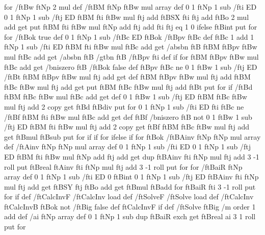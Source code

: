{{{{      } for
      /ftBw ftNp 2 mul def
      /ftBM ftNp ftBw mul array def
      0 1 ftNp 1 sub { /fti ED
        0 1 ftNp 1 sub { /ftj ED
          ftBM fti ftBw mul ftj add ftBSX fti ftj add ftBo 2 mul add get put
          ftBM fti ftBw mul ftNp add ftj add fti ftj eq { 1 }{ 0 } ifelse ftBint put
        } for
      } for
      /ftBok true def
      0 1 ftNp 1 sub { /ftBc ED
        ftBok {
          /ftBpv ftBc def
          ftBc 1 add 1 ftNp 1 sub { /fti ED
            ftBM fti ftBw mul ftBc add get /absbn ftB
            ftBM ftBpv ftBw mul ftBc add get /absbn ftB
            /gtbn ftB { /ftBpv fti def } if
          } for
          ftBM ftBpv ftBw mul ftBc add get /bniszero ftB { /ftBok false def }{
            ftBpv ftBc ne {
              0 1 ftBw 1 sub { /ftj ED
                /ftBt ftBM ftBpv ftBw mul ftj add get def
                ftBM ftBpv ftBw mul ftj add ftBM ftBc ftBw mul ftj add get put
                ftBM ftBc ftBw mul ftj add ftBt put
              } for
            } if
            /ftBd ftBM ftBc ftBw mul ftBc add get def
            0 1 ftBw 1 sub { /ftj ED
              ftBM ftBc ftBw mul ftj add 2 copy get ftBd ftBdiv put } for
            0 1 ftNp 1 sub { /fti ED
              fti ftBc ne {
                /ftBf ftBM fti ftBw mul ftBc add get def
                ftBf /bniszero ftB not {
                  0 1 ftBw 1 sub { /ftj ED
                    ftBM fti ftBw mul ftj add 2 copy get
                    ftBf ftBM ftBc ftBw mul ftj add get ftBmul ftBsub put
                  } for
                } if
              } if
            } for
          } ifelse
        } if
      } for
      ftBok {
        /ftBAinv ftNp ftNp mul array def /ftAinv ftNp ftNp mul array def
        0 1 ftNp 1 sub { /fti ED
          0 1 ftNp 1 sub { /ftj ED
            ftBM fti ftBw mul ftNp add ftj add get
            dup ftBAinv fti ftNp mul ftj add 3 -1 roll put
            ftBreal ftAinv fti ftNp mul ftj add 3 -1 roll put
          } for
        } for
        /ftBaiR ftNp array def
        0 1 ftNp 1 sub { /fti ED
          0 ftBint
          0 1 ftNp 1 sub { /ftj ED
            ftBAinv fti ftNp mul ftj add get ftBSY ftj ftBo add get ftBmul ftBadd } for
          ftBaiR fti 3 -1 roll put
        } for
      } if
    } def
    /ftCalcInvF /ftCalcInv load def /ftSolveF /ftSolve load def
    /ftCalcInv { ftCalcInvB ftBok not { /ftBig false def ftCalcInvF } if } def
    /ftSolve { ftBig {
        /m order 1 add def /ai ftNp array def
        0 1 ftNp 1 sub { dup ftBaiR exch get ftBreal ai 3 1 roll put } for
}}}}
